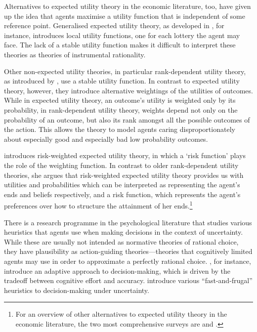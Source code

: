 Alternatives to expected utility theory in the economic literature, too, have given up the idea that agents maximise a utility function that is independent of some reference point. Generalised expected utility theory, as developed in \citet{Machina1982}, for instance, introduces local utility functions, one for each lottery the agent may face. The lack of a stable utility function makes it difficult to interpret these theories as theories of instrumental rationality.

Other non-expected utility theories, in particular rank-dependent utility theory, as introduced by \citet{Quiggin1982}, use a stable utility function. In contrast to expected utility theory, however, they introduce alternative weightings of the utilities of outcomes. While in expected utility theory, an outcome's utility is weighted only by its probability, in rank-dependent utility theory, weights depend not only on the probability of an outcome, but also its rank amongst all the possible outcomes of the action. This allows the theory to model agents caring disproportionately about especially good and especially bad low probability outcomes.

\citet{Buchak2013} introduces risk-weighted expected utility theory, in which a `risk function' plays the role of the weighting function. In contrast to older rank-dependent utility theories, she argues that risk-weighted expected utility theory provides us with utilities and probabilities which can be interpreted as representing the agent's ends and beliefs respectively, and a risk function, which represents the agent's preferences over how to structure the attainment of her ends.\footnote{For an overview of other alternatives to expected utility theory in the economic literature, the two most comprehensive surveys are \citet{Schmidt2004} and \citet{Sugden2004}.}

There is a research programme in the psychological literature that studies various heuristics that agents use when making decisions in the context of uncertainty. While these are usually not intended as normative theories of rational choice, they have plausibility as action-guiding theories---theories that cognitively limited agents may use in order to approximate a perfectly rational choice. \citet{Payneetal1993}, for instance, introduce an adaptive approach to decision-making, which is driven by the tradeoff between cognitive effort and accuracy.
\citet{GigerenzerTodd2000} introduce various ``fast-and-frugal'' heuristics to decision-making under uncertainty.

